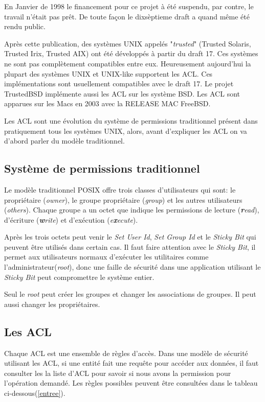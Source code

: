 \documentclass{article}
\begin{document}
En Janvier de 1998\cite{aclsuse} le financement pour ce projet à été suspendu, par contre, le travail n'était pas prêt. De toute façon le dixsèptieme draft a quand même été rendu public\cite{posix17}.
 
Après cette publication, des systèmes UNIX appelés "\emph{trusted}" (Trusted Solaris, Trusted Irix, Trusted AIX) ont été développés à partir du draft 17. Ces systèmes ne sont pas complètement compatibles entre eux. Heureusement aujourd'hui la plupart des systèmes UNIX et UNIX-like supportent les ACL. Ces implémentations sont usuellement compatibles avec le draft 17. Le projet TrustedBSD implémente aussi les ACL sur les système BSD. Les ACL sont apparues sur les Macs en 2003 avec la RELEASE MAC FreeBSD.
 
Les ACL sont une évolution du système de permissions traditionnel présent dans pratiquement tous les systèmes UNIX, alors, avant d'expliquer les ACL on va d'abord parler du modèle traditionnel.
 
\subsection*{Système de permissions traditionnel}
 
Le modèle traditionnel POSIX offre trois classes d'utilisateurs qui sont: le propriétaire (\emph{owner}), le groupe propriétaire (\emph{group}) et les autres utilisateurs (\emph{others}). Chaque groupe a un octet que indique les permissions de lecture (\emph{\textbf{r}ead}), d'écriture (\emph{\textbf{w}rite}) et d'exécution (\emph{e\textbf{x}ecute}).
 
Après les trois octets peut venir le \emph{Set User Id}, \emph{Set Group Id} et le \emph{Sticky Bit} qui peuvent être utilisés dans certain cas. Il faut faire attention avec le \emph{Sticky Bit}, il permet aux utilisateurs normaux d'exécuter les utilitaires comme l'administrateur(\emph{root}), donc une faille de sécurité dans une application utilisant le \emph{Sticky Bit} peut compromettre le système entier.
 
Seul le \emph{root} peut créer les groupes et changer les associations de groupes. Il peut aussi changer les propriétaires.
 
\subsection*{Les ACL}
 
Chaque ACL est une ensemble de règles d'accès. Dans une modèle de sécurité utilisant les ACL, si une entité fait une requête pour accéder aux données, il faut consulter les la liste d'ACL pour savoir si nous avons la permission pour l'opération demandé. Les règles possibles peuvent être consultées dans le tableau ci-dessous(\ref{entree}).
\end{document}
